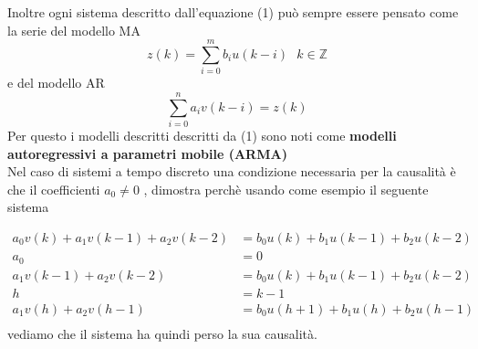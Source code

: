 \documentclass{article}
\theoremstyle{definition}
\begin{document}
	Inoltre ogni sistema descritto dall'equazione (1) può sempre essere pensato come la serie del modello MA 
	$$z(k)=\sum_{i=0}^{m}b_i u(k-i) \ \ \ k \in \mathbb{Z}$$
	e del modello AR
	$$\sum_{i=0}^{n}a_iv(k-i)=z(k)$$
	Per questo i modelli descritti descritti  da (1) sono noti come \textbf{modelli autoregressivi a parametri mobile (ARMA)}\\
	Nel caso di sistemi a tempo discreto una condizione necessaria per la causalità è che il coefficienti $a_0\neq 0$ , dimostra perchè usando come esempio il seguente sistema
	
	\begin{align*}
		a_0v(k)+a_1v(k-1)+a_2v(k-2)&=	b_0u(k)+b_1u(k-1)+b_2u(k-2) \\ 
		a_0&=0 \\ 
		a_1v(k-1)+a_2v(k-2)&=	b_0u(k)+b_1u(k-1)+b_2u(k-2) \\
		h &= k-1 \\
			a_1v(h)+a_2v(h-1)&=	b_0u(h+1)+b_1u(h)+b_2u(h-1) \\
	\end{align*}
	vediamo che il sistema ha quindi perso la sua causalità.
	
	
	
	
	
	
	
	
	
	
\end{document}
